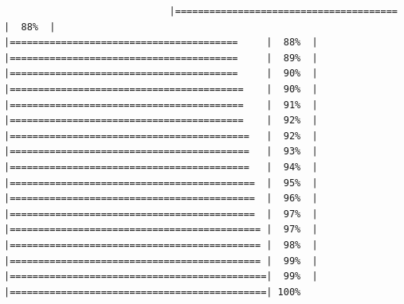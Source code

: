 \documentclass[
  krantz2]{krantz}
\begin{document}
\begin{verbatim}
                             |=======================================      |  88%  |                                                     |========================================     |  88%  |                                                     |========================================     |  89%  |                                                     |========================================     |  90%  |                                                     |=========================================    |  90%  |                                                     |=========================================    |  91%  |                                                     |=========================================    |  92%  |                                                     |==========================================   |  92%  |                                                     |==========================================   |  93%  |                                                     |==========================================   |  94%  |                                                     |===========================================  |  95%  |                                                     |===========================================  |  96%  |                                                     |===========================================  |  97%  |                                                     |============================================ |  97%  |                                                     |============================================ |  98%  |                                                     |============================================ |  99%  |                                                     |=============================================|  99%  |                                                     |=============================================| 100%
\end{verbatim}
\end{document}
